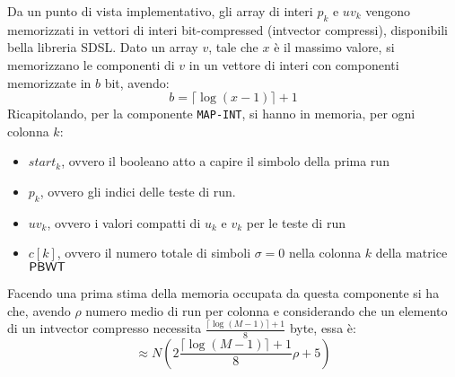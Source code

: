 Da un punto di vista implementativo, gli array di interi $p_k$ e $uv_k$ vengono
memorizzati in vettori di interi bit-compressed (intvector compressi),
disponibili bella libreria 
SDSL. Dato un array $v$, 
tale che $x$ è il massimo valore, si memorizzano le componenti di $v$ in un
vettore di interi con componenti memorizzate in $b$ bit, avendo:
\begin{equation}
  \label{eq:bc1}
  b=\lceil\log(x-1)\rceil+1
\end{equation}
Ricapitolando, per la componente \texttt{MAP-INT}, si hanno in memoria, per
ogni colonna $k$:
\begin{itemize}
  \item $start_k$, ovvero il booleano atto a capire il simbolo della prima
  run
  \item $p_k$, ovvero gli indici delle teste di run. 
  \item $uv_k$, ovvero i valori compatti di $u_k$ e $v_k$ per le teste di run
  \item $c[k]$, ovvero il numero totale di simboli $\sigma=0$ nella colonna
  $k$ della matrice $\mbox{\rm {\sf PBWT}}$
\end{itemize}
Facendo una prima stima della memoria occupata da questa componente si ha che,
avendo $\rho$ numero medio di run per colonna e considerando che un elemento di
un intvector 
compresso necessita $\frac{\lceil\log(M-1)\rceil+1}{8}$ byte, essa è:
\begin{equation}
  \label{eq:mapintmem}
  \approx N\left(2\frac{\lceil\log(M-1)\rceil+1}{8}\rho+5\right)
\end{equation}
